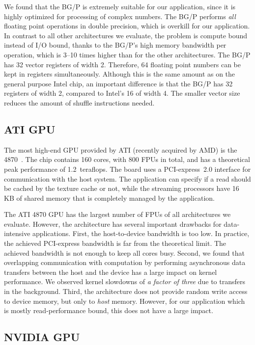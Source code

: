 \documentclass{article}
\begin{document}
We found that the BG/P is extremely suitable for our application,
since it is highly optimized for processing of complex numbers.
The BG/P performs \emph{all} floating point operations in double
precision, which is overkill for our application.
In contrast to all other architectures we evaluate, the problem is compute
bound instead of I/O bound, thanks to the BG/P's high memory bandwidth per
operation, which is 3--10 times higher than for the other architectures.
The BG/P has 32 vector registers of width 2.  Therefore, 64 floating
point numbers can be kept in registers
simultaneously. Although this is the same amount as on the general purpose
Intel chip, an important difference is that the BG/P has 32
registers of width 2, compared to Intel's 16 of width 4.  The smaller
vector size reduces the amount of shuffle instructions needed.


\subsection{ATI GPU}

The most high-end GPU provided by ATI (recently acquired by AMD) is
the 4870~\cite{amd-manual}.  The chip contains 160 cores, with 800 FPUs in total, 
and has a theoretical peak performance of
1.2~teraflops. The board uses a PCI-express~2.0 interface
for communication with the host system.
The application can specify if a read should be
cached by the texture cache or not, while the streaming processors have 16 KB of shared
memory that is completely managed by the application.

The ATI 4870 GPU has the largest number of FPUs of all architectures
we evaluate.  However, the architecture has several important
drawbacks for data-intensive applications.  First, the
host-to-device bandwidth is too low. In practice, the achieved
PCI-express bandwidth is far from the theoretical limit. The achieved
bandwidth is not enough to keep all cores busy.  Second, we found that
overlapping communication with computation by performing asynchronous
data transfers between the host and the device has a large impact on
kernel performance. We observed kernel slowdowns of \emph{a factor of
three} due to transfers in the background.  Third, the architecture
does not provide random write access to device memory, but only to
\emph{host} memory. However, for our application which is mostly
read-performance bound, this does not have a large impact.


\subsection{NVIDIA GPU}
\end{document}

